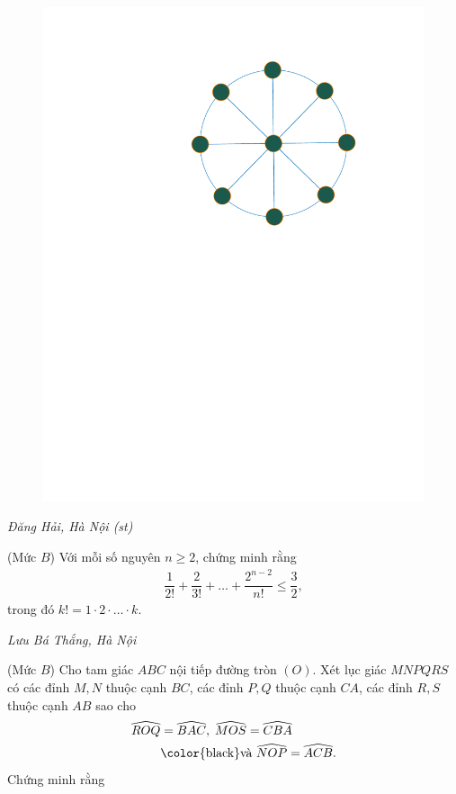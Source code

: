 \begin{multicols}{2}
\begin{figure}[H]
		\includegraphics[width=0.8\linewidth]{P634}
		\vspace*{-5pt}
	\end{figure}
	\begin{flushright}
		\textit{Đăng Hải, Hà Nội (st)}
	\end{flushright}
	{}
	(Mức $B$) Với mỗi số nguyên $n\ge2$, chứng minh rằng
	\begin{align*}
		\dfrac{1}{2!}+\dfrac{2}{3!}+\ldots+\dfrac{2^{n-2}}{n!}\le \dfrac{3}{2},
	\end{align*}
	trong đó $k!=1\cdot2\cdot\ldots\cdot k$.
	\begin{flushright}
		\textit{Lưu Bá Thắng, Hà Nội}
	\end{flushright}
	{}
	(Mức $B$) Cho tam giác $ ABC $ nội tiếp đường tròn $(O)$. Xét lục giác $MNPQRS$ có các đỉnh $M, N$ thuộc cạnh $BC$, các đỉnh $P, Q$ thuộc cạnh $CA$, các đỉnh $R, S$ thuộc cạnh $AB$ sao cho
	\begin{align*}
			\widehat{ROQ} &=\widehat{BAC},\; \widehat{MOS} =\widehat{CBA}\\
			&\text{\color{black}và } \widehat{NOP }= \widehat{ACB}.
	\end{align*}
	Chứng minh rằng 
	\begin{align*}

\end{align*}
\end{multicols}
